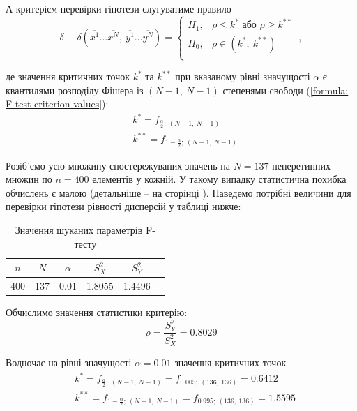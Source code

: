А критерієм перевірки гіпотези слугуватиме правило
\begin{equation*}
    \delta\equiv\delta(\overline{ x^1}\ldots \overline{x^N},\ \overline{y^1}\ldots \overline{y^N})=
    \begin{cases}
        H_1, & \rho\leqslant k^* \text{ або } \rho\geqslant k^{**} \\
        H_0, & \rho\in (k^*,\ k^{**}) \\
    \end{cases}\ ,
\end{equation*}

де значення критичних точок $k^*$ та $k^{**}$ при вказаному рівні значущості $\alpha$ є квантилями розподілу 
Фішера із $(N-1,\ N-1)$ степенями свободи (\ref{formula: F-test criterion values}):
\begin{align*}
    &k^* = f_{\frac{\alpha}{2};\ (N-1,\ N-1)} \\
    &k^{**} = f_{1-\frac{\alpha}{2};\ (N-1,\ N-1)}
\end{align*}

Розіб'ємо усю множину спостережуваних значень на $N=137$ неперетинних множин по $n=400$ елементів у кожній. 
У такому випадку статистична похибка обчислень є малою (детальніше -- на сторінці \pageref{page: MATH percentage point}). 
Наведемо потрібні величини для перевірки гіпотези рівності дисперсій у таблиці нижче:

\vspace{0.8cm}
\begin{table}[H]
    \begin{center}
        \begin{tabular}{||c|c|c|c|c|c||}
            \hline
            $n$ & $N$ & $\alpha$ & $S_X^2$ & $S_Y^2$ \\
            \hline \hline
            400 & 137 & 0.01 & 1.8055 & 1.4496 \\
            \hline
        \end{tabular}
        \caption{Значення шуканих параметрів F-тесту}
        \label{table: MATH F-test}
    \end{center}
\end{table}

Обчислимо значення статистики критерію:
\begin{equation*}
    \rho = \frac{S_Y^2}{S_X^2} = 0.8029
\end{equation*}

Водночас на рівні значущості $\alpha=0.01$ значення критичних точок
\begin{align*} 
   &k^* = f_{\frac{\alpha}{2};\ (N-1,\ N-1)} = f_{0.005;\ (136,\ 136)} = 0.6412 \\
   &k^{**} = f_{1-\frac{\alpha}{2};\ (N-1,\ N-1)} = f_{0.995;\ (136,\ 136)} = 1.5595
\end{align*}

